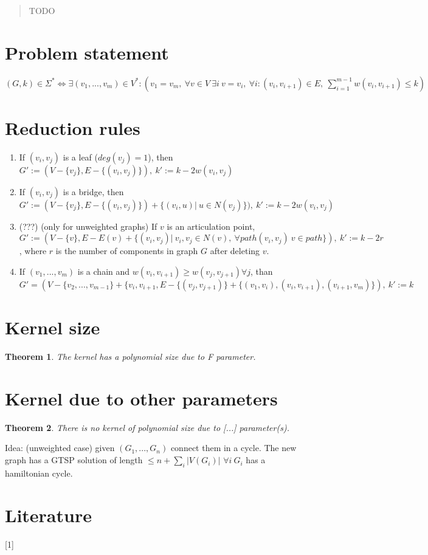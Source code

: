 \documentclass{article}
\newtheorem{theorem}{Theorem}[section]
\theoremstyle{remark}
\theoremstyle{definition}
\begin{document}
 
\tableofcontents

\begin{abstract}
  TODO
\end{abstract}
\section{Problem statement}
$(G, k) \in \Sigma^* \iff \exists (v_1, ..., v_m) \in V^*: (v_1 = v_m, \ \forall v \in V \ \exists i \ v = v_i, \ \forall i: (v_i, v_{i + 1}) \in E, \ \sum \limits_{i = 1}^{m - 1} w(v_i, v_{i + 1}) \leq k)$

\section{Reduction rules}
\begin{enumerate}
    \item If $(v_i, v_j)$ is a leaf ($deg(v_j) = 1$), then $G' := (V - \{v_j\}, E - \{(v_i, v_j)\}), \ k' := k - 2w(v_i, v_j)$
    \item If $(v_i, v_j)$ is a bridge, then $G' := (V - \{v_j\}, E - \{(v_i, v_j)\}) + \{(v_i, u) | \ u \in N(v_j)\}), \ k' := k - 2w(v_i, v_j)$
    \item (???) (only for unweighted graphs) If $v$ is an articulation point, $G' := (V - \{v\}, E - E(v) + \{(v_i, v_j)| \ v_i, v_j \in N(v), \ \forall path(v_i, v_j) \ v \in path \}), \ k' := k - 2r$, where $r$ is the number of components in graph $G$ after deleting $v$.
    \item If $(v_1, ..., v_m)$ is a chain and $w(v_i, v_{i + 1}) \geq w(v_j, v_{j + 1}) \forall j$, than $G' = (V - \{v_2, ..., v_{m - 1}\} + \{v_i, v_{i + 1}, E - \{(v_j, v_{j + 1})\} + \{(v_1, v_i), (v_i, v_{i+1}), (v_{i + 1}, v_m)\}), \ k' := k$
\end{enumerate}

\section{Kernel size}
\begin{theorem}
The kernel has a polynomial size due to F parameter.
\end{theorem}

\section{Kernel due to other parameters}
\begin{theorem}
There is no kernel of polynomial size due to [...] parameter(s).
\end{theorem}
Idea: (unweighted case) given $(G_1, ..., G_n)$ connect them in a cycle. The new graph has a GTSP solution of length  $\leq n + \sum \limits_{i} |V(G_i)|$ \iff $\forall i \ G_i$ has a hamiltonian cycle.

\section{Literature}
[1] 
\end{document}
